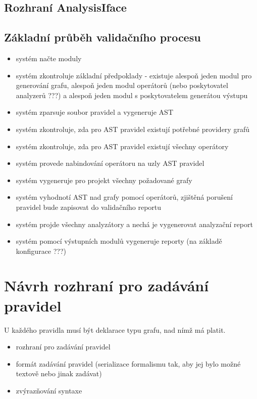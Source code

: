 \subsection{Rozhraní AnalysisIface}

\subsection{Základní průběh validačního procesu}
\begin{itemize}
\item systém načte moduly
\item systém zkontroluje základní předpoklady - existuje alespoň jeden modul pro generování grafu, alespoň jeden modul operátorů (nebo poskytovatel analyzerů ???) a alespoň jeden modul s poskytovatelem generátou výstupu
\item systém zparsuje soubor pravidel a vygeneruje AST
\item systém zkontroluje, zda pro AST pravidel existují potřebné providery grafů
\item systém zkontroluje, zda pro AST pravidel existují všechny operátory
\item systém provede nabindování operátoru na uzly AST pravidel
\item systém vygeneruje pro projekt všechny požadované grafy
\item systém vyhodnotí AST nad grafy pomocí operátorů, zjištěná porušení pravidel bude zapisovat do validačního reportu
\item systém projde všechny analyzátory a nechá je vygenerovat analyzační report
\item systém pomocí výstupních modulů vygeneruje reporty (na základě konfigurace ???)
\end{itemize}

\section{Návrh rozhraní pro zadávání pravidel}
U každého pravidla musí být deklarace typu grafu, nad nímž má platit.
\begin{itemize}
\item rozhraní pro zadávání pravidel
\item formát zadávání pravidel (serializace formalismu tak, aby jej bylo možné textově nebo jinak zadávat)
\item zvýrazňování syntaxe
\end{itemize}

